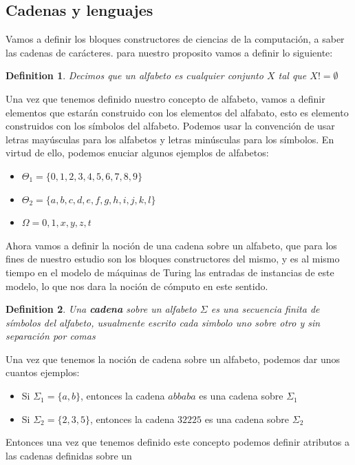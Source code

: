 \documentclass[10pt]{report}
\newtheorem{definition}{Definition}
\begin{document}
    \subsection{Cadenas y lenguajes}\label{sec:Cadenas-y-lenguajes}
    Vamos a definir los bloques constructores de ciencias de la computación, a saber las cadenas de carácteres.
    para nuestro proposito vamos a definir lo siguiente:\space
    \begin{definition}
            Decimos que un alfabeto es cualquier conjunto $X$ tal que $X != \emptyset$
    \end{definition}
    Una vez que tenemos definido nuestro concepto de alfabeto, vamos a definir elementos que estarán construido con los
    elementos del alfabato, esto es elemento construidos con los símbolos del alfabeto.\newline
    Podemos usar la convención de usar letras mayúsculas para los alfabetos y letras minúsculas para los símbolos.
    En virtud de ello, podemos enuciar algunos ejemplos de alfabetos:
    \begin{itemize}
        \item $\Theta_{1} = \{0,1,2,3,4,5,6,7,8,9 \}$
        \item $\Theta_{2} = \{a,b,c,d,e,f,g,h,i,j,k,l \}$
        \item $\Omega = { 0,1,x,y,z,t}$
    \end{itemize}\space
    Ahora vamos a definir la noción de una cadena sobre un alfabeto, que para los fines de nuestro estudio
    son los bloques constructores del mismo, y es al mismo tiempo en el modelo de
    máquinas de Turing las entradas de instancias de este modelo, lo que nos dara la noción de cómputo en este sentido.
    \begin{definition}
        Una \textbf{cadena} sobre un alfabeto $\Sigma$ es una secuencia finita de símbolos del alfabeto,
        usualmente escrito cada simbolo uno sobre otro y sin separación por comas
    \end{definition}
    Una vez que tenemos la noción de cadena sobre un alfabeto, podemos dar unos cuantos ejemplos:
    \begin{itemize}
        \item Si $\Sigma_{1} = \{a,b\}$, entonces la cadena $abbaba$ es una cadena sobre $\Sigma_{1}$
        \item Si $\Sigma_{2} = \{ 2,3,5 \}$, entonces la cadena $32225$ es una cadena sobre $\Sigma_{2}$
    \end{itemize}
    Entonces una vez que tenemos definido este concepto podemos definir atributos a las cadenas definidas sobre un
\end{document}
